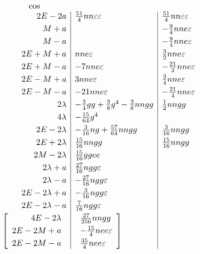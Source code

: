 \begingroup
\renewcommand{\thefootnote}{}
\endgroup
\clearpage
{}\thispagestyle{VIIPrinted638}
\[
\begin{array}{r|l|l}
\multicolumn{1}{c}{\cos}&\multicolumn{1}{c}{}&\\
2E-2a&\tfrac{51}{4}nn\varepsilon\varepsilon&\tfrac{51}{4}nn\varepsilon\varepsilon\\[3pt]
M+a&&-\tfrac94nne\varepsilon\\[3pt]
M-a&&-\tfrac94nne\varepsilon\\[3pt]
2E+M+a&nne\varepsilon&\tfrac32nne\varepsilon\\[3pt]
2E+M-a&-7nne\varepsilon&-\tfrac{21}{2}nne\varepsilon\\[3pt]
2E-M+a&3nne\varepsilon&\tfrac34nne\varepsilon\\[3pt]
2E-M-a&-21nne\varepsilon&-\tfrac{21}{4}nne\varepsilon\\[3pt]
2\lambda&-\tfrac34gg+\tfrac38g^4-\tfrac38nngg&\tfrac12nngg\\[3pt]
4\lambda&-\tfrac{15}{64}g^4&\\[3pt]
2E-2\lambda&-\tfrac{3}{16}ng+\tfrac{57}{64}nngg&\tfrac{3}{16}nngg\\[3pt]
2E+2\lambda&\tfrac{15}{16}nngg&\tfrac{15}{16}nngg\\[3pt]
2M-2\lambda&\tfrac{15}{16}ggee&\\[3pt]
2\lambda+a&\tfrac{27}{16}ngg\varepsilon&\\[3pt]
2\lambda-a&-\tfrac{27}{16}ngg\varepsilon&\\[3pt]
2E-2\lambda+a&-\tfrac{3}{16}ngg\varepsilon&\\[3pt]
2E-2\lambda-a&\tfrac{7}{16}ngg\varepsilon&\\[3pt]
\left[\begin{array}{r}
4E-2\lambda\\[3pt]
2E-2M+a\\[3pt]
2E-2M-a
\end{array}\right.&
\left.\begin{array}{l}
\tfrac{27}{256}nngg\\[3pt]
-\tfrac{15}{4}nee\varepsilon\\[3pt]
\tfrac{35}{4}nee\varepsilon
\end{array}\right]&
\end{array}
\]
